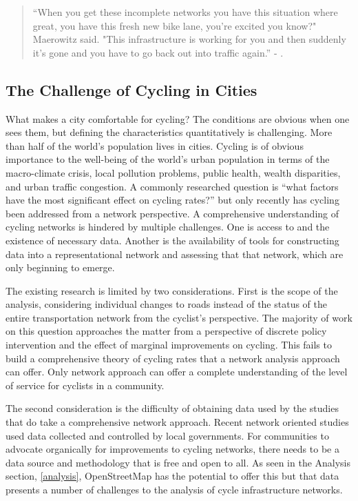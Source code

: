 

\begin{quote}
``When you get these incomplete networks you have this situation where great, you have this fresh new bike lane, you're excited you know?" Maerowitz said. "This infrastructure is working for you and then suddenly it's gone and you have to go back out into traffic again.'' - \cite{juhasz2019}.
\end{quote}
 
\subsection{The Challenge of Cycling in Cities}

What makes a city comfortable for cycling? The conditions are obvious when one sees them, but defining the characteristics quantitatively is challenging. More than half of the world's population lives in cities. Cycling is of obvious importance to the well-being of the world's  urban population in terms of the macro-climate crisis, local pollution problems,  public health, wealth disparities, and urban traffic congestion. A commonly researched question is ``what factors have the most significant effect on cycling rates?'' but only recently has cycling been addressed from a network perspective. A comprehensive understanding of cycling networks is hindered by multiple challenges. One is access to and the existence of necessary data. Another is the availability of tools for constructing data into a representational network and assessing that that network, which are only beginning to emerge.   

The existing research is limited by two considerations. First is the scope of the analysis, considering individual changes to roads instead of the status of the entire transportation network from the cyclist's perspective.  The majority of work on this question approaches the matter from a perspective of discrete policy intervention and the effect of marginal improvements on cycling. This fails to build a comprehensive theory of cycling rates that a network analysis approach can offer. Only network approach can offer a complete understanding of the level of service for cyclists in a community. 

The second consideration is the difficulty of obtaining data used by the studies that do take a comprehensive network approach. Recent network oriented studies used data collected and controlled by local governments. For communities to advocate organically for improvements to cycling networks, there needs to be a data source and methodology that is free and open to all. As seen in the Analysis section, \ref{analysis}, OpenStreetMap has the potential to offer this but that data presents a number of challenges to the analysis of cycle infrastructure networks.  

